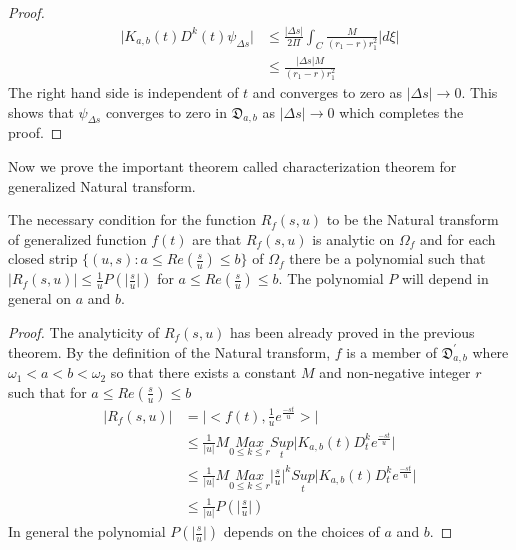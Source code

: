 \begin{proof}
\begin{align*}
 \vert K_{a,b}(t)D^{k}(t)\psi_{\Delta{s}}\vert&\leq\frac{\vert\Delta{s}\vert}{2\Pi}\int_{C}\frac{M}{(r_{1}-r)r_{1}^{2}} \vert d\xi\vert\\
 &\leq\frac{\vert\Delta{s}\vert M}{(r_{1}-r)r_{1}^{2}}
\end{align*}
 The right hand side is independent of $t$ and converges to zero as $ \vert\Delta{s}\vert\rightarrow 0 $. This shows that $\psi_{\Delta{s}}$ converges to zero in $\mathfrak{D}_{a,b}$ as $\vert\Delta{s}\vert\rightarrow 0 $ which completes the proof.
 \end{proof}
 Now we prove the important theorem called characterization theorem for generalized Natural transform.
 \begin{theorem}
 The necessary condition for the function $ R_{f}(s,u) $ to be the Natural transform of generalized function $f(t)$ are that $R_{f}(s,u)$ is analytic on $\Omega_{f}$ and for each closed strip $\lbrace(u,s):a\leq Re(\frac{s}{u})\leq b\rbrace $ of $\Omega_{f}$ there be a polynomial such that $\vert R_{f}(s,u)\vert\leq \frac{1}{u}P(\vert\frac{s}{u}\vert)$ for $ a\leq Re(\frac{s}{u})\leq b $. The polynomial $P$ will depend in general on $a$ and $b$.
\end{theorem}

\begin{proof}
 The analyticity of $ R_{f}(s,u) $ has been already proved in the previous theorem. By the definition of the Natural transform, $f$ is a member of $\mathfrak{D}_{a,b}^{'}$ where $\omega_{1}<a<b<\omega_{2}$ so that there exists a constant $M$ and non-negative integer $r$ such that for $a\leq Re(\frac{s}{u})\leq b$
 \begin{align*}
 \vert R_{f}(s,u)\vert &= \vert <f(t),\frac{1}{u}e^{\frac{-st}{u}}>\vert\\
&\leq\frac{1}{\vert u\vert}M \underset{0\leq k\leq r}{Max}\underset{t}{Sup}\vert K_{a,b}(t)D_{t}^{k}e^{\frac{-st}{u}}\vert\\
&\leq\frac{1}{\vert u\vert}M \underset{0\leq k\leq r}{Max}{\vert\frac{s}{u}\vert}^{k}\underset{t}{Sup}\vert K_{a,b}(t)D_{t}^{k}e^{\frac{-st}{u}}\vert\\
&\leq\frac{1}{\vert u\vert} P(\vert\frac{s}{u}\vert)
 \end{align*}
 In general the polynomial $P(\vert\frac{s}{u}\vert)$ depends on the choices of $a$ and $b$.
 \end{proof}
